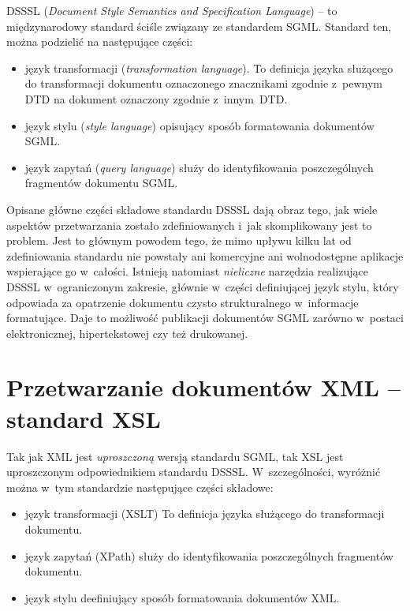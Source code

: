 \documentclass[brudnopis]{xmgr}
\begin{document}
DSSSL (\textit{Document Style Semantics and Specification Language\/})
-- to międzynarodowy standard ściśle związany ze standardem SGML.
Standard ten, można podzielić na następujące części:

\begin{itemize}
\item język transformacji (\textit{transformation language\/}).  To
  definicja języka służącego do transformacji dokumentu oznaczonego
  znacznikami zgodnie z~pewnym DTD na dokument oznaczony zgodnie
  z~innym~DTD.
\item język stylu (\textit{style language\/}) opisujący sposób
  formatowania dokumentów SGML.
\item język zapytań (\textit{query language\/}) służy do
  identyfikowania poszczególnych fragmentów dokumentu SGML.
\end{itemize}

Opisane główne części składowe standardu DSSSL dają obraz tego, jak
wiele aspektów przetwarzania zostało zdefiniowanych i~jak
skomplikowany jest to problem. Jest to głównym powodem tego, że mimo
upływu kilku lat od zdefiniowania standardu nie powstały ani
komercyjne ani wolnodostępne aplikacje wspierające go
w~całości. Istnieją natomiast \emph{nieliczne\/} narzędzia realizujące
DSSSL w~ograniczonym zakresie, głównie w~części definiującej język
stylu, który odpowiada za opatrzenie dokumentu czysto strukturalnego
w~informacje formatujące. Daje to możliwość publikacji dokumentów SGML
zarówno w~postaci elektronicznej, hipertekstowej czy też drukowanej.
      
\section{Przetwarzanie dokumentów XML -- standard XSL\label{s:xsl}}

Tak jak XML jest \emph{uproszczoną\/} wersją standardu SGML, tak XSL
jest uproszczonym odpowiednikiem standardu DSSSL. W~szczególności,
wyróżnić można w~tym standardzie następujące części składowe:

\begin{itemize}
\item język transformacji (XSLT) To definicja języka służącego do
  transformacji dokumentu.      
\item język zapytań (XPath) służy do identyfikowania poszczególnych
  fragmentów dokumentu.
\item język stylu deefiniujący sposób formatowania dokumentów XML.
\end{itemize}
\end{document}
